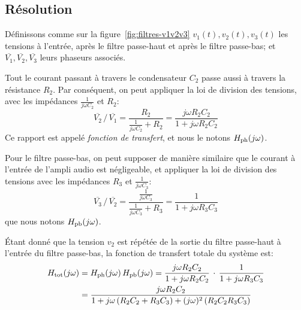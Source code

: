 \subsection{Résolution}
\label{complexes}

Définissons comme sur la figure~\ref{fig:filtres-v1v2v3}
$v_1(t),v_2(t),v_3(t)$ les tensions
à l'entrée, après le filtre passe-haut et après le filtre passe-bas;
et $\overline{V_1}, \overline{V_2}, \overline{V_3}$ leurs phaseurs associés.

Tout le courant passant à travers le condensateur $C_2$ passe
aussi à travers la résistance $R_2$.
Par conséquent, on peut appliquer la loi de division des tensions,
avec les impédances $\frac{1}{j\omega C_2}$ et $R_2$:
\begin{equation}
    \overline{V_2}\,\big/\,\overline{V_1}
    = \frac{R_2}{\frac{1}{j\omega C_2} + R_2}
    = \frac{j\omega R_2C_2}{1+j\omega R_2C_2}
\end{equation}
Ce rapport est appelé \emph{fonction de transfert}, et nous le notons
$H_{\mathrm{ph}}(j\omega)$.

Pour le filtre passe-bas, on peut supposer de manière similaire que
le courant à l'entrée de l'ampli audio est négligeable,
et appliquer la loi de division des tensions avec les impédances
$R_3$ et $\frac{1}{j\omega C_3}$:
\begin{equation}
    \overline{V_3}\,\big/\,\overline{V_2}
    = \frac{\frac{1}{j\omega C_3}}{\frac{1}{j\omega C_3} + R_3}
    = \frac{1}{1+j\omega R_3C_3}
\end{equation}
que nous notons $H_{\mathrm{pb}}(j\omega)$.

Étant donné que la tension $v_2$ est répétée de la sortie du filtre passe-haut
à l'entrée du filtre passe-bas, la fonction de transfert totale du système est:
\begin{align}
    H_{\mathrm{tot}}(j\omega) &= H_{\mathrm{ph}}(j\omega)\,H_{\mathrm{pb}}(j\omega) =
    \frac{j\omega R_2C_2}{1 + j\omega R_2C_2}\,\cdot\,
    \frac{1}{1 + j\omega R_3C_3}\\
    &= \frac{j\omega R_2C_2}{1 + j\omega\,(R_2C_2+R_3C_3) +
        (j\omega)^2\,(R_2C_2R_3C_3)}
\end{align}
